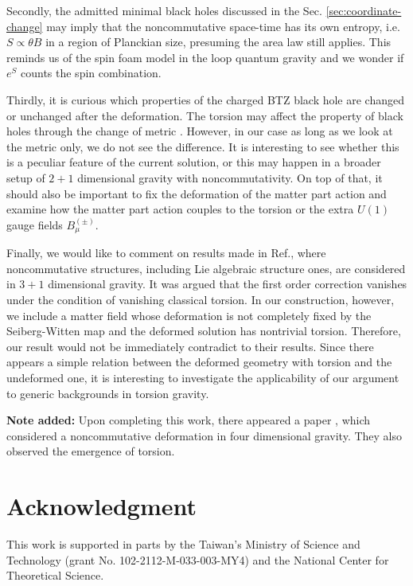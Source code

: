 \documentclass[11pt]{article}
\numberwithin{equation}{section}
\begin{document}
Secondly, the admitted minimal black holes discussed in the Sec. \ref{sec:coordinate-change} may imply 
that the noncommutative space-time has its own entropy, i.e. $S \propto \theta B$ in a region of Planckian size, presuming the area law still applies.
This reminds us of the spin foam model in the loop quantum gravity \cite{Reisenberger:1996pu} and we wonder if $e^S$ counts the spin combination.

Thirdly, it is curious which properties of the charged BTZ black hole are changed or unchanged after the deformation.
The torsion may affect the property of black holes through the change of metric \cite{torsion_BH}.
However, in our case as long as we look at the metric only, we do not see the difference.
It is interesting to see whether this is a peculiar feature of the current solution, or this may happen in
a broader setup of $2+1$ dimensional gravity with noncommutativity.
On top of that, it should also be important to fix the deformation of the matter part action and 
examine how the matter part action couples to the torsion or the extra $U(1)$ gauge fields
$B_\mu^{(\pm)}$.

Finally, we would like to comment on results made in Ref.\cite{Mukherjee:2006nd, Banerjee:2007th}, where noncommutative structures, including Lie algebraic structure ones, are considered in $3+1$ dimensional gravity.  It was argued that the first order correction vanishes under the condition
of vanishing classical torsion.
In our construction, however, we include a matter field whose deformation is not completely fixed
by the Seiberg-Witten map and the deformed solution has nontrivial torsion.
Therefore, our result would not be immediately contradict to their results.
Since there appears a simple relation between the deformed geometry with torsion
and the undeformed one, it is interesting to investigate the applicability of our argument
to generic backgrounds in torsion gravity.


\textbf{Note added:} Upon completing this work, there appeared a paper \cite{Ciric:2016isg}
, which considered a noncommutative deformation in four dimensional gravity.  
They also observed the emergence of torsion.




\section*{Acknowledgment}
\label{sec:acknowledement}
This work is supported in parts by the Taiwan's Ministry of Science and Technology (grant No. 102-2112-M-033-003-MY4) and the National Center for Theoretical Science.
\end{document}
